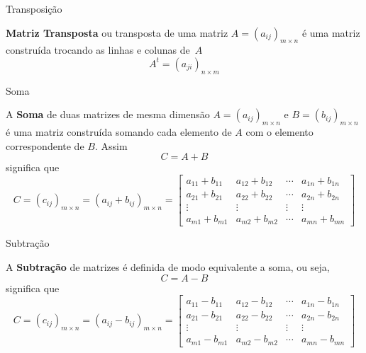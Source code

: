 \begin{teoria}{Transposição}
    
    \textbf{Matriz Transposta} ou transposta de uma matriz $A=(a_{ij})_{m\times n}$ é uma matriz construída trocando as linhas e colunas de~$A$
    \[ A^t = (a_{ji})_{n\times m} \]
    
\end{teoria}

\begin{teoria}{Soma}
    
    A \textbf{Soma} de duas matrizes de mesma dimensão $A=(a_{ij})_{m\times n}$ e $B=(b_{ij})_{m\times n}$
    é uma matriz construída somando cada elemento de $A$ com o elemento correspondente de $B$. 
    Assim \[C=A+B\] significa que
    \[ C = (c_{ij})_{m\times n} = (a_{ij}+b_{ij})_{m\times n} =
        \left[
        \begin{array}{cccc}
            a_{11} + b_{11} & a_{12} + b_{12} & \cdots & a_{1n} + b_{1n} \\
            a_{21} + b_{21} & a_{22} + b_{22} & \cdots & a_{2n} + b_{2n} \\
            \vdots          & \vdots          & \vdots & \vdots          \\
            a_{m1} + b_{m1} & a_{m2} + b_{m2} & \cdots & a_{mn} + b_{mn}
        \end{array}
        \right]
    \]
        
\end{teoria}

\begin{teoria}{Subtração}
    
    A \textbf{Subtração} de matrizes é definida de modo equivalente a soma, ou seja, \[C=A-B\] significa que
    \[ C = (c_{ij})_{m\times n} = (a_{ij}-b_{ij})_{m\times n} =
        \left[
        \begin{array}{cccc}
            a_{11} - b_{11} & a_{12} - b_{12} & \cdots & a_{1n} - b_{1n} \\
            a_{21} - b_{21} & a_{22} - b_{22} & \cdots & a_{2n} - b_{2n} \\
            \vdots          & \vdots          & \vdots & \vdots          \\
            a_{m1} - b_{m1} & a_{m2} - b_{m2} & \cdots & a_{mn} - b_{mn}
        \end{array}
        \right]
    \]

\end{teoria}

